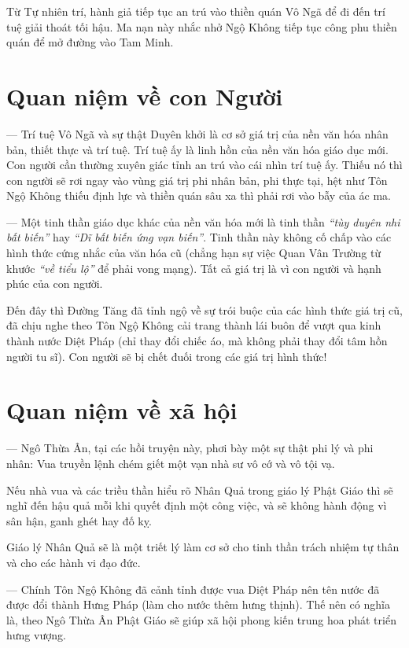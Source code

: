 Từ Tự nhiên trí, hành giả tiếp tục an trú vào thiền quán Vô Ngã để đi đến trí tuệ giải thoát tối hậu. Ma nạn này nhắc nhở Ngộ Không tiếp tục công phu thiền quán để mở đường vào Tam Minh.

\section{Quan niệm về con Người} %
\label{sec:84_85_con_nguoi}

— Trí tuệ Vô Ngã và sự thật Duyên khởi là cơ sở giá trị của nền văn hóa nhân bản, thiết thực và trí tuệ. Trí tuệ ấy là linh hồn của nền văn hóa giáo dục mới. Con người cần thường xuyên giác tỉnh an trú vào cái nhìn trí tuệ ấy. Thiếu nó thì con người sẽ rơi ngay vào vùng giá trị phi nhân bản, phi thực tại, hệt như Tôn Ngộ Không thiếu định lực và thiền quán sâu xa thì phải rơi vào bẫy của ác ma.

— Một tinh thần giáo dục khác của nền văn hóa mới là tinh thần \emph{``tùy duyên nhi bất biến''} hay \emph{``Dĩ bất biến ứng vạn biến''}. Tinh thần này không cố chấp vào các hình thức cứng nhắc của văn hóa cũ (chẳng hạn sự việc Quan Vân Trường từ khước \emph{``về tiểu lộ''} để phải vong mạng). Tất cả giá trị là vì con người và hạnh phúc của con người.

Đến đây thì Đường Tăng đã tỉnh ngộ về sự trói buộc của các hình thức giá trị cũ, đã chịu nghe theo Tôn Ngộ Không cải trang thành lái buôn để vượt qua kinh thành nước Diệt Pháp (chỉ thay đổi chiếc áo, mà không phải thay đổi tâm hồn người tu sĩ). Con người sẽ bị chết đuối trong các giá trị hình thức!

\section{Quan niệm về xã hội} %
\label{sec:84_85_xa_hoi}

— Ngô Thừa Ân, tại các hồi truyện này, phơi bày một sự thật phi lý và phi nhân: Vua truyền lệnh chém giết một vạn nhà sư vô cớ và vô tội vạ.

Nếu nhà vua và các triều thần hiểu rõ Nhân Quả trong giáo lý Phật Giáo thì sẽ nghĩ đến hậu quả mỗi khi quyết định một công việc, và sẽ không hành động vì sân hận, ganh ghét hay đố kỵ.

Giáo lý Nhân Quả sẽ là một triết lý làm cơ sở cho tinh thần trách nhiệm tự thân và cho các hành vi đạo đức.

— Chính Tôn Ngộ Không đã cảnh tỉnh được vua Diệt Pháp nên tên nước đã được đổi thành Hưng Pháp (làm cho nước thêm hưng thịnh). Thế nên có nghĩa là, theo Ngô Thừa Ân Phật Giáo sẽ giúp xã hội phong kiến trung hoa phát triển hưng vượng.
